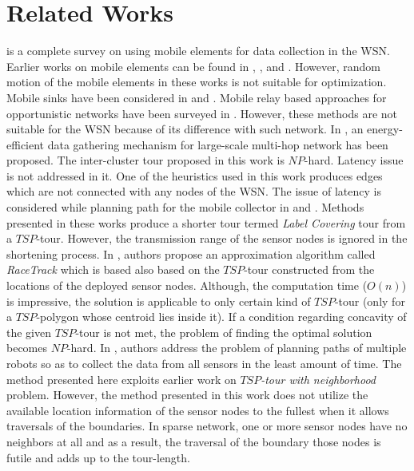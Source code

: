 \documentclass{llncs}
\begin{document}
\section{Related Works}
\cite{DiFrancesco:2011:DCW:1993042.1993049} is a complete survey on using mobile elements for data
collection in the WSN. Earlier works on mobile elements can be found in 
\cite{Zhao:2003:MFP:795675.797105},
\cite{Shah03datamules},
\cite{Zhao:2004:MFA:989459.989483} 
and \cite{Jun:2005:TLE:1048931.1049847}. However, random motion of the mobile elements in these
works is not suitable for optimization. Mobile sinks have been considered in
\cite{Wang:2005:ESM:1042440.1043284} and \cite{RaoWB08}. 
Mobile relay based approaches for opportunistic networks have been surveyed in
\cite{conti_2008_opportunistic}. However, these methods are not suitable for the WSN because of its
difference with such network. In \cite{Ma:2007:SED:1313042.1313066}, an energy-efficient data
gathering mechanism for large-scale multi-hop network has been proposed. The
inter-cluster tour proposed in this work is $NP$-hard. Latency issue is not addressed in it.
One of the heuristics used in this work produces edges which are not connected with any nodes of the
WSN. The issue of latency is considered while planning path for the mobile collector in
\cite{Sugihara:2008} and \cite{Sugihara:2011}. Methods presented in these works
produce a shorter tour termed \textit{Label Covering} tour from a $TSP$-tour. However, the
transmission range of the sensor nodes is ignored in the shortening process. 
In \cite{Yuan:2010:RaceTrack}, authors propose an approximation algorithm called \textit{RaceTrack} 
which is based also based on
the $TSP$-tour constructed from the locations of the deployed
sensor nodes. Although, the computation time ($O(n)$) is impressive, the solution is
applicable to only certain kind of $TSP$-tour 
(only for a $TSP$-polygon whose centroid lies inside it). If a condition regarding concavity of
the given $TSP$-tour is not met, the problem of
finding the optimal solution becomes $NP$-hard. In \cite{Bhadauria:2011:RDM:1967380.1967382}, 
authors address  the problem of planning
 paths of multiple robots so as to collect the data from all sensors in the least amount of time. 
 The method presented here exploits earlier work on $TSP$\textit{-tour with neighborhood} problem.
 However, the  method presented in this work does not utilize the available location information of
 the sensor nodes to the fullest when it allows traversals of the boundaries. In sparse network, one
 or more sensor nodes have no neighbors at all and as a result, the traversal of the boundary
 those nodes is futile and adds up to the tour-length.
 
\end{document}
